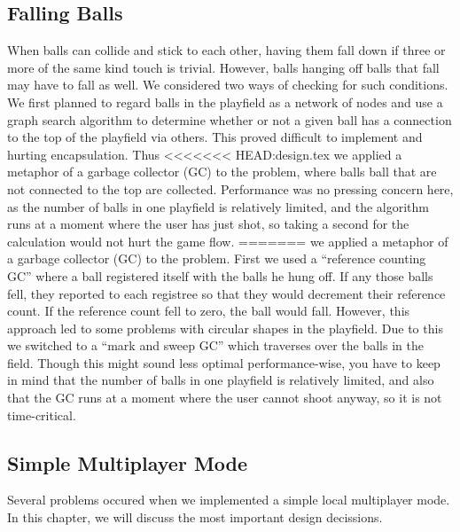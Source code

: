 \subsection{Falling Balls}
\label{sec:garbage}
When balls can collide and stick to each other, having them fall down 
if three or more of the same kind touch is trivial. However, balls 
hanging off balls that fall may have to fall as well. We considered 
two ways of checking for such conditions. We first planned to regard balls in the 
playfield as a network of nodes and use a graph search algorithm to determine 
whether or not a given ball has a connection to the top of the playfield via 
others. This proved difficult to implement and hurting encapsulation. Thus 
<<<<<<< HEAD:design.tex
we applied a metaphor of a garbage collector (GC) to the problem, where balls
ball that are not connected to the top are collected. Performance was no pressing 
concern here, as the number of balls in one playfield is relatively limited, 
and the algorithm runs at a moment where the user has just shot, so taking a second 
for the calculation would not hurt the game flow.
=======
we applied a metaphor of a garbage collector (GC) to the problem. First we used a
``reference counting GC'' where a ball registered itself with the balls he hung 
off. If any those balls fell, they reported to each registree so that they would 
decrement their reference count. If the reference count fell to zero, the ball 
would fall. However, this approach led to some problems with circular shapes 
in the playfield. Due to this we switched to a ``mark and sweep GC'' which traverses
over the balls in the field. Though this might sound less optimal performance-wise,
you have to keep in mind that the number of balls in one playfield is relatively limited, 
and also that the GC runs at a moment where the user cannot shoot anyway, so 
it is not time-critical.

\subsection{Simple Multiplayer Mode}
Several problems occured when we implemented a simple local multiplayer mode. In this chapter, 
we will discuss the most important design decissions.

%

